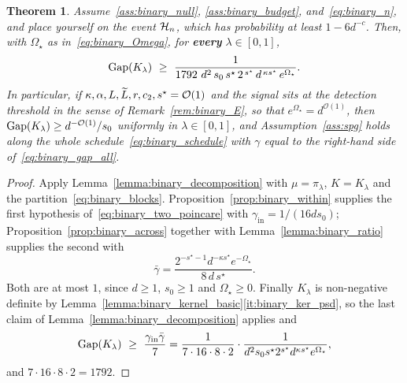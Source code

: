 \documentclass[aos]{imsart}%
\newcommand{\OO}{\mathcal{O}}  %
\theoremstyle{plain}
\newtheorem{theorem}{Theorem}[section]
\theoremstyle{definition}
\begin{document}
    \begin{theorem}
        \label{th:binary_gap_all}
        Assume~\ref{ass:binary_null}, \ref{ass:binary_budget},
        and~\eqref{eq:binary_n}, and place yourself on
        the event $\mathcal{H}_n$, which has probability at least $1-6d^{-c}$. Then,
        with $\Omega_\star$ as in~\eqref{eq:binary_Omega}, for
        \textbf{every} $\lambda\in[0,1]$,
        \begin{equation}
            \label{eq:binary_gap_all}
            \mathrm{Gap}(K_\lambda)\ \geq\
            \frac{1}{1792\ d^{2}\,s_0\,s^{\star}\,2^{\,s^{\star}}\,
            d^{\,\kappa s^{\star}}\,e^{\Omega_\star}} .
        \end{equation}
        In particular, if $\kappa,\alpha,L,\Ltil,r,c_2,s^{\star}=\OO(1)$ and
        the signal sits at the detection threshold in the sense of
        Remark~\ref{rem:binary_E}, so that $e^{\Omega_\star}=d^{\OO(1)}$, then
        $\Gap(K_\lambda)\geq d^{-\OO(1)}/s_0$ uniformly in $\lambda\in[0,1]$,
        and Assumption~\ref{ass:spg} holds along the whole
        schedule~\eqref{eq:binary_schedule} with $\gamma$ equal to the
        right-hand side of~\eqref{eq:binary_gap_all}.
    \end{theorem}

    \begin{proof}
        Apply Lemma~\ref{lemma:binary_decomposition} with $\mu=\pi_\lambda$,
        $K=K_\lambda$ and the partition~\eqref{eq:binary_blocks}.
        Proposition~\ref{prop:binary_within} supplies the first hypothesis
        of~\eqref{eq:binary_two_poincare} with
        $\gamma_{\mathrm{in}}=1/(16ds_0)$; Proposition~\ref{prop:binary_across}
        together with Lemma~\ref{lemma:binary_ratio} supplies the second with
        \begin{equation*}
            \bar\gamma=\frac{2^{-s^{\star}-1}d^{-\kappa s^{\star}}
            e^{-\Omega_\star}}{8\,d\,s^{\star}} .
        \end{equation*}
        Both are at most $1$, since $d\geq1$, $s_0\geq1$ and
        $\Omega_\star\geq0$. Finally $K_\lambda$ is non-negative definite by
        Lemma~\ref{lemma:binary_kernel_basic}\ref{it:binary_ker_psd}, so the
        last claim of
        Lemma~\ref{lemma:binary_decomposition} applies and
        \begin{equation*}
            \Gap(K_\lambda)\ \geq\ \frac{\gamma_{\mathrm{in}}\bar\gamma}{7}
            =\frac{1}{7\cdot16\cdot8\cdot2}\cdot
            \frac{1}{d^{2}s_0s^{\star}2^{s^{\star}}
            d^{\kappa s^{\star}}e^{\Omega_\star}},
        \end{equation*}
        and $7\cdot16\cdot8\cdot2=1792$.
    \end{proof}
\end{document}
